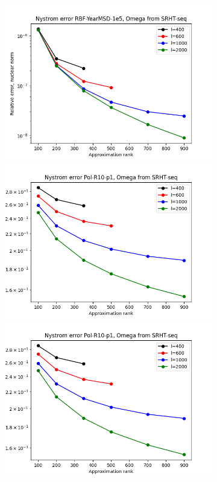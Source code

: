 \documentclass{article}
\theoremstyle{definition}
\begin{document}
\begin{appendices}
\begin{figure}
\begin{subfigure}[t]{0.35\textwidth}
    \includegraphics[width=\textwidth]{plots/relerror/relerror_RBF-YearMSD-1e5_SRHT-seq.png}
    \includegraphics[width=\textwidth]{plots/relerror/relerror_Pol-R10-p1_SRHT-seq.png}
    \includegraphics[width=\textwidth]{plots/relerror/relerror_Pol-R10-p1_SRHT-seq.png}

\end{subfigure}
\end{figure}
\end{appendices}
\end{document}
